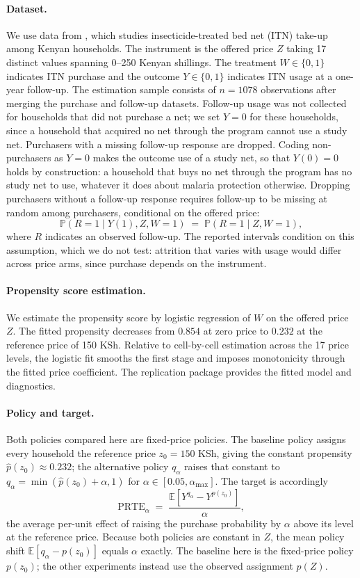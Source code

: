 \paragraph{Dataset.}
We use data from \citet{dupas2014subsidies}, which studies insecticide-treated bed net (ITN) take-up among Kenyan households. The instrument is the offered price $Z$ taking 17 distinct values spanning 0--250 Kenyan shillings. The treatment $W \in \{0,1\}$ indicates ITN purchase and the outcome $Y \in \{0,1\}$ indicates ITN usage at a one-year follow-up. The estimation sample consists of $n = 1078$ observations after merging the purchase and follow-up datasets. Follow-up usage was not collected for households that did not purchase a net; we set $Y=0$ for these households, since a household that acquired no net through the program cannot use a study net. Purchasers with a missing follow-up response are dropped. Coding non-purchasers as $Y=0$ makes the outcome use of a study net, so that $Y(0)=0$ holds by construction: a household that buys no net through the program has no study net to use, whatever it does about malaria protection otherwise. Dropping purchasers without a follow-up response requires follow-up to be missing at random among purchasers, conditional on the offered price:
\[
    \mathbb{P}(R=1 \mid Y(1), Z, W=1) \;=\; \mathbb{P}(R=1 \mid Z, W=1),
\]
where $R$ indicates an observed follow-up. The reported intervals condition on this assumption, which we do not test: attrition that varies with usage would differ across price arms, since purchase depends on the instrument.

\paragraph{Propensity score estimation.}
We estimate the propensity score by logistic regression of $W$ on the offered price $Z$. The fitted propensity decreases from $0.854$ at zero price to $0.232$ at the reference price of 150 KSh. Relative to cell-by-cell estimation across the 17 price levels, the logistic fit smooths the first stage and imposes monotonicity through the fitted price coefficient. The replication package provides the fitted model and diagnostics.

\paragraph{Policy and target.}
Both policies compared here are fixed-price policies. The baseline policy assigns every household the reference price $z_0 = 150$ KSh, giving the constant propensity $\hat{p}(z_0) \approx 0.232$; the alternative policy $q_\alpha$ raises that constant to $q_\alpha = \min(\hat{p}(z_0) + \alpha, 1)$ for $\alpha \in [0.05, \alpha_{\max}]$. The target is accordingly
\[
    \text{PRTE}_\alpha \;=\; \frac{\mathbb{E}\!\left[Y^{q_\alpha}-Y^{p(z_0)}\right]}{\alpha},
\]
the average per-unit effect of raising the purchase probability by $\alpha$ above its level at the reference price. Because both policies are constant in $Z$, the mean policy shift $\mathbb{E}[q_\alpha - p(z_0)]$ equals $\alpha$ exactly. The baseline here is the fixed-price policy $p(z_0)$; the other experiments instead use the observed assignment $p(Z)$.

